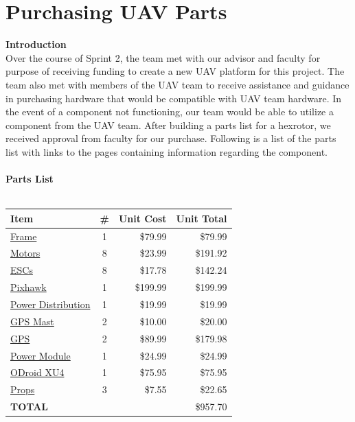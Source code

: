 \documentclass[11pt]{book}
\begin{document}
\section*{Purchasing UAV Parts}
\large{\textbf{Introduction}}\\
\normalsize
\noindent  Over the course of Sprint 2, the team met with our advisor and faculty for purpose of receiving funding to create a new UAV platform for this project. The team also met with members of the UAV team to receive assistance and guidance in purchasing hardware that would be compatible with UAV team hardware. In the event of a component not functioning, our team would be able to utilize a component from the UAV team. After building a parts list for a hexrotor, we received approval from faculty for our purchase. Following is a list of the parts list with links to the pages containing information regarding the component.\\
\vspace{4mm}\\
\large{\textbf{Parts List}}\\
\normalsize
\vspace{2mm}\\
\begin{tabular}{l | c| r | r}

\textbf{Item} & \textbf{\#} & \textbf{Unit Cost} & \textbf{Unit Total}\\
\hline
\href{http://hobbyking.com/hobbyking/store/__23790__Turnigy_Talon_Hexcopter_V1_0_Carbon_Fiber_Frame_625mm.html}{Frame} & 1 & \$79.99 & \$79.99  \\
\href{http://www.hobbypartz.com/05m-11-mc3525-850kv-14p.html}{Motors} & 8 & \$23.99 & \$191.92 \\
\href{http://www.hobbypartz.com/07e04-proton-30a.html}{ESCs} & 8 & \$17.78 & \$142.24 \\
\href{http://store.3drobotics.com/products/3dr-pixhawk}{Pixhawk} & 1 & \$199.99 & \$199.99 \\
\href{https://store.3drobotics.com/products/hexacopter-power-distribution-board-1}{Power Distribution} & 1 & \$19.99 & \$19.99 \\
\href{https://store.3drobotics.com/products/gps-mast}{GPS Mast} & 2 & \$10.00 & \$20.00 \\
\href{http://store.3drobotics.com/products/3dr-gps-ublox-with-compass}{GPS} & 2 & \$89.99 & \$179.98 \\
\href{https://store.3drobotics.com/products/apm-power-module-with-xt60-connectors}{Power Module} & 1 & \$24.99 & \$24.99 \\
\href{http://ameridroid.com/products/odroid-xu4}{ODroid XU4} & 1 & \$75.95 & \$75.95 \\
\href{http://hobbyking.com/hobbyking/store/__39773__Carbon_Fiber_Propeller_10x4_7_Black_CW_CCW_4pcs_.html}{Props} & 3 & \$7.55 & \$22.65 \\
\hline
\textbf{TOTAL} & & & \$957.70 \\
\end{tabular}
\end{document}
